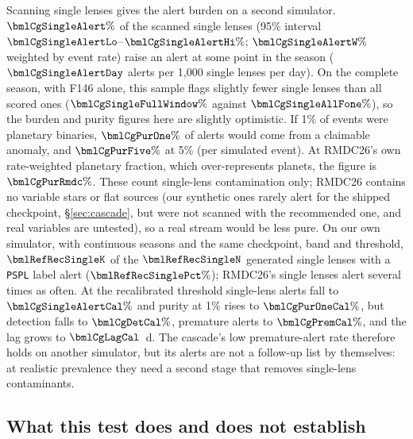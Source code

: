 Scanning single lenses gives the alert burden on a second simulator. $\bmlCgSingleAlert\%$ of the
scanned single lenses (95\% interval $\bmlCgSingleAlertLo$--$\bmlCgSingleAlertHi\%$; $\bmlCgSingleAlertW\%$
weighted by event rate) raise an alert at some point in the season ($\bmlCgSingleAlertDay$ alerts per 1,000
single lenses per day). On the complete season, with F146 alone, this sample flags slightly fewer single lenses
than all scored ones ($\bmlCgSingleFullWindow\%$ against $\bmlCgSingleAllFone\%$), so the burden and purity figures
here are slightly optimistic. If 1\% of events were planetary
binaries, $\bmlCgPurOne\%$ of alerts would come from a claimable anomaly, and $\bmlCgPurFive\%$ at 5\% (per
simulated event). At RMDC26's own rate-weighted planetary fraction, which over-represents planets, the figure is
$\bmlCgPurRmdc\%$. These count single-lens contamination only; RMDC26 contains no variable stars or flat
sources (our synthetic ones rarely alert for the shipped checkpoint, \S\ref{sec:cascade}, but were not scanned
with the recommended one, and real variables are untested), so a real stream would be less pure. On our own simulator, with continuous seasons and the same checkpoint, band and
threshold, $\bmlRefRecSingleK$ of the $\bmlRefRecSingleN$ generated single lenses with a \texttt{PSPL} label alert
($\bmlRefRecSinglePct\%$);
RMDC26's single lenses alert several times as often. At the recalibrated
threshold single-lens alerts fall to $\bmlCgSingleAlertCal\%$ and purity at 1\% rises to
$\bmlCgPurOneCal\%$, but detection falls to $\bmlCgDetCal\%$, premature alerts to $\bmlCgPremCal\%$, and the
lag grows to $\bmlCgLagCal$~d. The cascade's low premature-alert rate therefore holds on another simulator,
but its alerts are not a follow-up list by themselves: at realistic prevalence they need a second stage that
removes single-lens contaminants.

\subsection{What this test does and does not establish}

